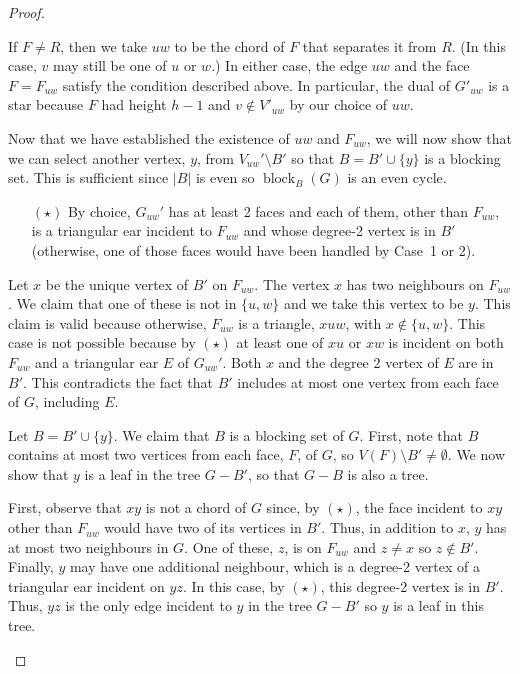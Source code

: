 \documentclass{patmorin}
\DeclareMathOperator{\block}{block}
\begin{document}
\begin{proof}
\begin{enumerate}
  If $F\neq R$, then we take $uw$ to be the chord of $F$ that separates
  it from $R$.  (In this case, $v$ may still be one of $u$ or $w$.)
  In either case, the edge $uw$ and the face $F=F_{uw}$ satisfy the
  condition described above.  In particular, the dual of $G'_{uw}$ is a
  star because $F$ had height $h-1$ and $v\not\in V'_{uw}$ by our choice
  of $uw$.

  Now that we have established the existence of $uw$ and $F_{uw}$,
  we will now show that we can select another vertex, $y$, from
  $V_{uw}'\setminus B'$ so that $B=B'\cup\{y\}$ is a blocking set.
  This is sufficient since $|B|$ is even so $\block_B(G)$ is an even
  cycle.  

  \begin{itemize}
  \item[$(\star)$]
  By choice, $G_{uw}'$ has at least 2 faces and each of them, other
  than $F_{uw}$, is a triangular ear incident to $F_{uw}$ and whose
  degree-2 vertex is in $B'$ (otherwise, one of those faces would have
  been handled by Case~1 or 2).
  \end{itemize}

  Let $x$ be the unique vertex of $B'$ on $F_{uw}$. The vertex $x$ has two
  neighbours on $F_{uw}$.  We claim that one of these is not in $\{u,w\}$
  and we take this vertex to be $y$.  This claim is valid because
  otherwise, $F_{uw}$ is a triangle, $xuw$, with $x\not\in\{u,w\}$.
  This case is not possible because by $(\star)$ at least one of $xu$ or
  $xw$ is incident on both $F_{uw}$ and a triangular ear $E$ of $G_{uw}'$.
  Both $x$ and the degree 2 vertex of $E$ are in $B'$.  This contradicts
  the fact that $B'$ includes at most one vertex from each face of $G$,
  including $E$.

  Let $B=B'\cup\{y\}$.  We claim that $B$ is a blocking set of $G$.
  First, note that $B$ contains at most two vertices from each face, $F$,
  of $G$, so $V(F)\setminus B'\neq \emptyset$.  We now show that $y$ is a
  leaf in the tree $G-B'$, so that $G-B$ is also a tree.

  First, observe that $xy$ is not a chord of $G$ since, by $(\star)$,
  the face incident to $xy$ other than $F_{uw}$ would have two of its
  vertices in $B'$.  Thus, in addition to $x$, $y$ has at most two
  neighbours in $G$.  One of these, $z$, is on $F_{uw}$ and $z\neq x$
  so $z\notin B'$.  Finally, $y$ may have one additional neighbour,
  which is a degree-2 vertex of a triangular ear incident on $yz$.
  In this case, by $(\star)$, this degree-2 vertex is in $B'$.  Thus,
  $yz$ is the only edge incident to $y$ in the tree $G-B'$
  so $y$ is a leaf in this tree. \qedhere
\end{enumerate}
\end{proof}
\end{document}
